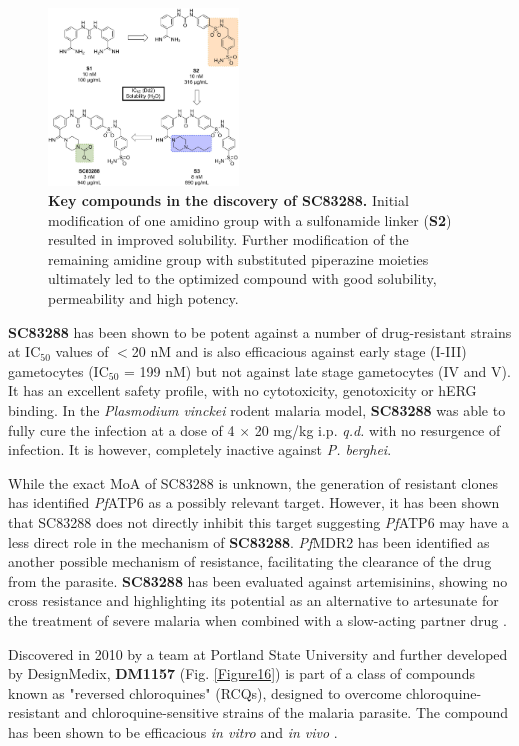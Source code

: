 \documentclass[twocolumn]{bmcart}%
\begin{document}
\begin{figure}[h]
	\includegraphics [width=0.45\textwidth] {Figure15}
	\caption{{\bf Key compounds in the discovery of SC83288.} Initial modification of one amidino group with a sulfonamide linker (\textbf{S2}) resulted in improved solubility. Further modification of the remaining amidine group with substituted piperazine moieties ultimately led to the optimized compound with good solubility, permeability and high potency.}
	\label{Figure15}
\end{figure}

\textbf{SC83288} has been shown to be potent against a number of drug-resistant strains at IC$_{50}$ values of $<$20 nM and is also efficacious against early stage (I-III) gametocytes (IC$_{50}$ = 199 nM) but not against late stage gametocytes (IV and V). It has an excellent safety profile, with no cytotoxicity, genotoxicity or hERG binding. In the \textit{Plasmodium vinckei} rodent malaria model, \textbf{SC83288} was able to fully cure the infection at a dose of 4 $\times$ 20 mg/kg i.p. \textit{q.d.} with no resurgence of infection. It is however, completely inactive against \textit{P. berghei}.

While the exact MoA of SC83288 is unknown, the generation of resistant clones has identified \textit{Pf}ATP6 as a possibly relevant target. However, it has been shown that SC83288 does not directly inhibit this target suggesting \textit{Pf}ATP6 may have a less direct role in the mechanism of \textbf{SC83288}. \textit{Pf}MDR2 has been identified as another possible mechanism of resistance, facilitating the clearance of the drug from the parasite. \textbf{SC83288} has been evaluated against artemisinins, showing no cross resistance and highlighting its potential as an alternative to artesunate for the treatment of severe malaria when combined with a slow-acting partner drug \cite{Duffey2018}.

\hrulefill

Discovered in 2010 by a team at Portland State University and further developed by DesignMedix, \textbf{DM1157} (Fig. \ref{Figure16}) is part of a class of compounds known as "reversed chloroquines" (RCQs), designed to overcome chloroquine-resistant and chloroquine-sensitive strains of the malaria parasite. The compound has been shown to be efficacious \textit{in vitro} and \textit{in vivo} \cite{Burgess2010}.
\end{document}
